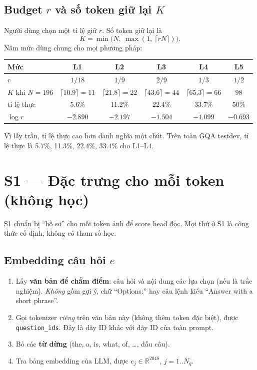 \documentclass[11pt,a4paper]{article}
\newcommand{\R}{\mathbb{R}}
\newcommand{\file}[1]{\texttt{\small #1}}
\begin{document}
\subsection{Budget $r$ và số token giữ lại $K$}
Người dùng chọn một tỉ lệ giữ $r$. Số token giữ lại là
\begin{equation}
K=\min\!\big(N,\ \max(1,\ \lceil rN\rceil)\big).
\end{equation}
Năm mức dùng chung cho mọi phương pháp:

\begin{center}
\begin{tabular}{@{}lccccc@{}}
\toprule
Mức & L1 & L2 & L3 & L4 & L5\\
\midrule
$r$ & $1/18$ & $1/9$ & $2/9$ & $1/3$ & $1/2$\\
$K$ khi $N=196$ & $\lceil10.9\rceil=11$ & $\lceil21.8\rceil=22$ & $\lceil43.6\rceil=44$ & $\lceil65.3\rceil=66$ & $98$\\
tỉ lệ thực & 5.6\% & 11.2\% & 22.4\% & 33.7\% & 50\%\\
$\log r$ & $-2.890$ & $-2.197$ & $-1.504$ & $-1.099$ & $-0.693$\\
\bottomrule
\end{tabular}
\end{center}
Vì lấy trần, tỉ lệ thực cao hơn danh nghĩa một chút. Trên toàn GQA testdev, tỉ lệ thực là 5.7\%, 11.3\%, 22.4\%, 33.4\% cho L1--L4.

\section{S1 --- Đặc trưng cho mỗi token (không học)}
\label{sec:s1}

S1 chuẩn bị ``hồ sơ'' cho mỗi token ảnh để score head đọc. Mọi thứ ở S1 là công thức cố định, không có tham số học.

\subsection{Embedding câu hỏi $e$}
\label{sec:question}
\begin{enumerate}[leftmargin=*]
\item Lấy \textbf{văn bản để chấm điểm}: câu hỏi và nội dung các lựa chọn (nếu là trắc nghiệm). \emph{Không} gồm gợi ý, chữ ``Options:'' hay câu lệnh kiểu ``Answer with a short phrase''.
\item Gọi tokenizer \emph{riêng} trên văn bản này (không thêm token đặc biệt), được \file{question\_ids}. Đây là dãy ID khác với dãy ID của toàn prompt.
\item Bỏ các \textbf{từ dừng} (the, a, is, what, of, \dots, dấu câu).
\item Tra bảng embedding của LLM, được $e_j\in\R^{2048}$, $j=1..N_q$.
\end{enumerate}
\end{document}
